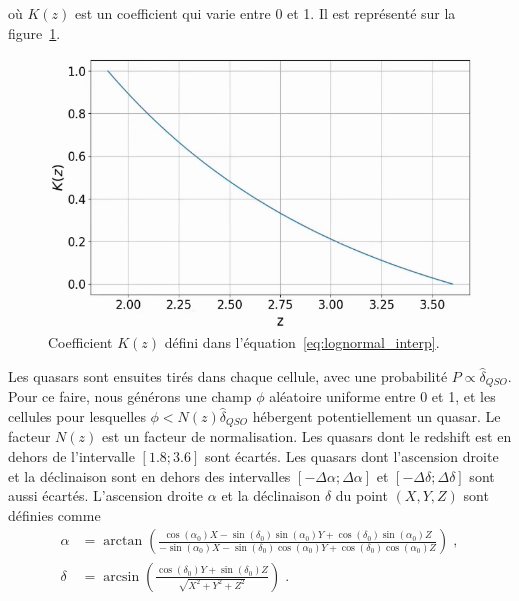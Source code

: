 \documentclass[11pt, twoside, a4paper, openright]{report}
\begin{document}
où $K(z)$ est un coefficient qui varie entre 0 et 1. Il est représenté sur la figure~\ref{fig:kz}.
\begin{figure}
  \centering
  \label{fig:kz}
  \includegraphics[scale=0.4]{kz}
  \caption{Coefficient $K(z)$ défini dans l'équation~\ref{eq:lognormal_interp}.}
\end{figure}
Les quasars sont ensuites tirés dans chaque cellule, avec une probabilité $P \propto \hat \delta_{QSO}$. Pour ce faire, nous générons une champ $\phi$ aléatoire uniforme entre 0 et 1, et les cellules pour lesquelles $\phi < N(z) \hat \delta_{QSO}$ hébergent potentiellement un quasar. Le facteur $N(z)$ est un facteur de normalisation. Les quasars dont le redshift est en dehors de l'intervalle $[\num{1.8}; \num{3.6}]$ sont écartés.
Les quasars dont l'ascension droite et la déclinaison sont en dehors des intervalles $[ - \Delta \alpha ; \Delta \alpha]$ et $[ - \Delta \delta ; \Delta \delta]$ sont aussi écartés.
L'ascension droite $\alpha$ et la déclinaison $\delta$ du point $(X,Y,Z)$ sont définies comme
\begin{align}
  \label{eq:radec}
  \alpha &= \arctan(\frac{
  \cos(\alpha_0)X - \sin(\delta_0)\sin(\alpha_0)Y + \cos(\delta_0)\sin(\alpha_0)Z
  }{
  - \sin(\alpha_0)X - \sin(\delta_0)\cos(\alpha_0)Y + \cos(\delta_0)\cos(\alpha_0)Z
           }) \; ,\\
  \delta &= \arcsin(\frac{
           \cos(\delta_0)Y + \sin(\delta_0) Z
           }{
           \sqrt{X^2 + Y^2 + Z^2}
           }) \; .
\end{align}
\end{document}
